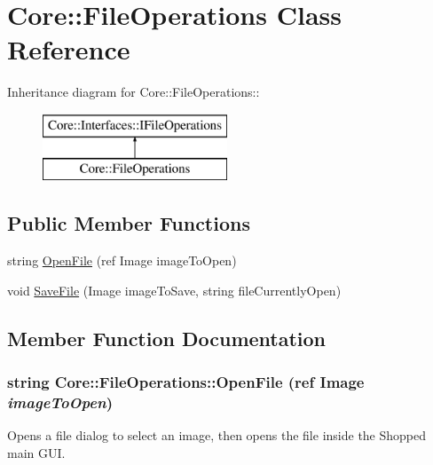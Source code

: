 \hypertarget{class_core_1_1_file_operations}{
\section{Core::FileOperations Class Reference}
\label{class_core_1_1_file_operations}
}
Inheritance diagram for Core::FileOperations::\begin{figure}[H]
\begin{center}
\leavevmode
\includegraphics[height=2cm]{class_core_1_1_file_operations}
\end{center}
\end{figure}
\subsection*{Public Member Functions}
\begin{DoxyCompactItemize}
\item 
string \hyperlink{class_core_1_1_file_operations_a23fa84c311fb8051caa8e751d99ef027}{OpenFile} (ref Image imageToOpen)
\item 
void \hyperlink{class_core_1_1_file_operations_a4437acc296a0a32cdf8727ef5a7e94ce}{SaveFile} (Image imageToSave, string fileCurrentlyOpen)
\end{DoxyCompactItemize}


\subsection{Member Function Documentation}
\hypertarget{class_core_1_1_file_operations_a23fa84c311fb8051caa8e751d99ef027}{
\subsubsection[{OpenFile}]{\setlength{\rightskip}{0pt plus 5cm}string Core::FileOperations::OpenFile (ref Image {\em imageToOpen})}}
\label{class_core_1_1_file_operations_a23fa84c311fb8051caa8e751d99ef027}
Opens a file dialog to select an image, then opens the file inside the Shopped main GUI.


